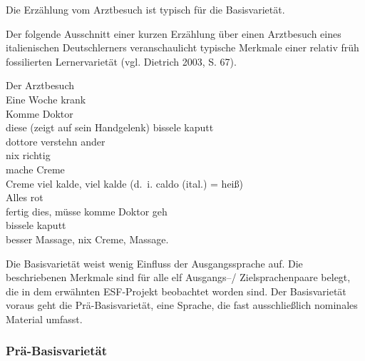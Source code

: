 \documentclass[
  letterpaper,
]{scrbook}
\begin{document}
Die Erzählung vom Arztbesuch ist typisch für die Basisvarietät.

\begin{tcolorbox}[enhanced jigsaw, arc=.35mm, left=2mm, bottomrule=.15mm, toprule=.15mm, colframe=quarto-callout-note-color-frame, breakable, rightrule=.15mm, opacityback=0, colback=white, leftrule=.75mm]
\begin{minipage}[t]{5.5mm}
\textcolor{quarto-callout-note-color}{\faInfo}
\end{minipage}%
\begin{minipage}[t]{\textwidth - 5.5mm}

Der folgende Ausschnitt einer kurzen Erzählung über einen Arztbesuch
eines italienischen Deutschlerners veranschaulicht typische Merkmale
einer relativ früh fossilierten Lernervarietät (vgl. Dietrich 2003, S.
67).

Der Arztbesuch\\
Eine Woche krank\\
Komme Doktor\\
diese (zeigt auf sein Handgelenk) bissele kaputt\\
dottore verstehn ander\\
nix richtig\\
mache Creme\\
Creme viel kalde, viel kalde (d.~i. caldo (ital.) = heiß)\\
Alles rot\\
fertig dies, müsse komme Doktor geh\\
bissele kaputt\\
besser Massage, nix Creme, Massage.

\end{minipage}%
\end{tcolorbox}

Die Basisvarietät weist wenig Einfluss der Ausgangssprache auf. Die
beschriebenen Merkmale sind für alle elf Ausgangs--/ Zielsprachenpaare
belegt, die in dem erwähnten ESF-Projekt beobachtet worden sind. Der
Basisvarietät voraus geht die Prä-Basisvarietät, eine Sprache, die fast
ausschließlich nominales Material umfasst.

\hypertarget{pruxe4-basisvarietuxe4t-1}{%
\subsubsection{Prä-Basisvarietät}\label{pruxe4-basisvarietuxe4t-1}}
\end{document}
